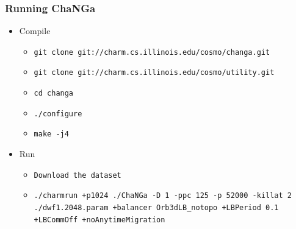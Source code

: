 \begin{frame}
  \frametitle{Running ChaNGa}
  \begin{itemize}
    \item Compile
    \begin{itemize}
      \item \texttt{git clone git://charm.cs.illinois.edu/cosmo/changa.git}
      \item \texttt{git clone git://charm.cs.illinois.edu/cosmo/utility.git}
      \item \texttt{cd changa}
      \item \texttt{./configure}
      \item \texttt{make -j4}
    \end{itemize}
    \item Run
    \begin{itemize}
      \item \texttt{Download the dataset}
      \item \texttt{./charmrun +p1024 ./ChaNGa -D 1 -ppc 125 -p 52000 -killat 2 ./dwf1.2048.param
      +balancer Orb3dLB\_notopo +LBPeriod 0.1 +LBCommOff +noAnytimeMigration}
    \end{itemize}
  \end{itemize}
\end{frame}

